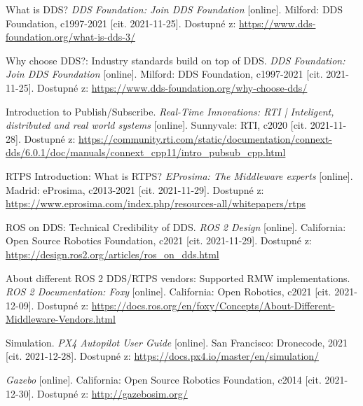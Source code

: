 \begin{thebibliography}{99}
What is DDS? \textit{DDS Foundation: Join DDS Foundation} [online]. Milford: DDS Foundation, c1997-2021 [cit. 2021-11-25]. Dostupné z: \href{https://www.dds-foundation.org/what-is-dds-3/}{https://www.dds-foundation.org/what-is-dds-3/}

Why choose DDS?: Industry standards build on top of DDS. \textit{DDS Foundation: Join DDS Foundation} [online]. Milford: DDS Foundation, c1997-2021 [cit. 2021-11-25]. Dostupné z: \href{https://www.dds-foundation.org/why-choose-dds/}{https://www.dds-foundation.org/why-choose-dds/}

Introduction to Publish/Subscribe. \textit{Real-Time Innovations: RTI | Inteligent, distributed and real world systems} [online]. Sunnyvale: RTI, c2020 [cit. 2021-11-28]. Dostupné z: \href{https://community.rti.com/static/documentation/connext-dds/6.0.1/doc/manuals/connext\_dds/getting\_started/cpp11/intro\_pubsub\_cpp.html}{https://community.rti.com/static/documentation/connext-dds/6.0.1/doc/manuals/connext\_cpp11/intro\_pubsub\_cpp.html}

RTPS Introduction: What is RTPS? \textit{EProsima: The Middleware experts} [online]. Madrid: eProsima, c2013-2021 [cit. 2021-11-29]. Dostupné z: \href{https://www.eprosima.com/index.php/resources-all/whitepapers/rtps}{https://www.eprosima.com/index.php/resources-all/whitepapers/rtps}

ROS on DDS: Technical Credibility of DDS. \textit{ROS 2 Design} [online]. California: Open Source Robotics Foundation, c2021 [cit. 2021-11-29]. Dostupné z: \href{https://design.ros2.org/articles/ros\_on\_dds.html}{https://design.ros2.org/articles/ros\_on\_dds.html}


About different ROS 2 DDS/RTPS vendors: Supported RMW implementations. \textit{ROS 2 Documentation: Foxy} [online]. California: Open Robotics, c2021 [cit. 2021-12-09]. Dostupné z: \href{https://docs.ros.org/en/foxy/Concepts/About-Different-Middleware-Vendors.html}{https://docs.ros.org/en/foxy/Concepts/About-Different-Middleware-Vendors.html}

Simulation. \textit{PX4 Autopilot User Guide} [online]. San Francisco: Dronecode, 2021 [cit. 2021-12-28]. Dostupné z: \href{https://docs.px4.io/master/en/simulation/}{https://docs.px4.io/master/en/simulation/}

\textit{Gazebo} [online]. California: Open Source Robotics Foundation, c2014 [cit. 2021-12-30]. Dostupné z: \href{http://gazebosim.org/}{http://gazebosim.org/}


\end{thebibliography}
